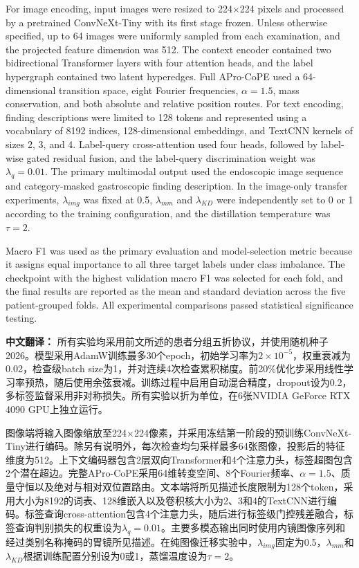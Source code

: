 \documentclass[Afour,sagev,times]{sagej}
\begin{document}
For image encoding, input images were resized to 224$\times$224 pixels and processed by a pretrained ConvNeXt-Tiny with its first stage frozen. Unless otherwise specified, up to 64 images were uniformly sampled from each examination, and the projected feature dimension was 512. The context encoder contained two bidirectional Transformer layers with four attention heads, and the label hypergraph contained two latent hyperedges. Full APro-CoPE used a 64-dimensional transition space, eight Fourier frequencies, $\alpha=1.5$, mass conservation, and both absolute and relative position routes. For text encoding, finding descriptions were limited to 128 tokens and represented using a vocabulary of 8192 indices, 128-dimensional embeddings, and TextCNN kernels of sizes 2, 3, and 4. Label-query cross-attention used four heads, followed by label-wise gated residual fusion, and the label-query discrimination weight was $\lambda_q=0.01$. The primary multimodal output used the endoscopic image sequence and category-masked gastroscopic finding description. In the image-only transfer experiments, $\lambda_{img}$ was fixed at 0.5, $\lambda_{mm}$ and $\lambda_{KD}$ were independently set to 0 or 1 according to the training configuration, and the distillation temperature was $\tau=2$.

Macro F1 was used as the primary evaluation and model-selection metric because it assigns equal importance to all three target labels under class imbalance. The checkpoint with the highest validation macro F1 was selected for each fold, and the final results are reported as the mean and standard deviation across the five patient-grouped folds. All experimental comparisons passed statistical significance testing.

\textbf{中文翻译：} 所有实验均采用前文所述的患者分组五折协议，并使用随机种子2026。模型采用AdamW训练最多30个epoch，初始学习率为$2\times10^{-5}$，权重衰减为0.02，检查级batch size为1，并对连续4次检查累积梯度。前20\%优化步采用线性学习率预热，随后使用余弦衰减。训练过程中启用自动混合精度，dropout设为0.2，多标签监督采用非对称损失。所有实验以折为单位，在6张NVIDIA GeForce RTX 4090 GPU上独立运行。

图像端将输入图像缩放至224$\times$224像素，并采用冻结第一阶段的预训练ConvNeXt-Tiny进行编码。除另有说明外，每次检查均匀采样最多64张图像，投影后的特征维度为512。上下文编码器包含2层双向Transformer和4个注意力头，标签超图包含2个潜在超边。完整APro-CoPE采用64维转变空间、8个Fourier频率、$\alpha=1.5$、质量守恒以及绝对与相对双位置路由。文本端将所见描述长度限制为128个token，采用大小为8192的词表、128维嵌入以及卷积核大小为2、3和4的TextCNN进行编码。标签查询cross-attention包含4个注意力头，随后进行标签级门控残差融合，标签查询判别损失的权重设为$\lambda_q=0.01$。主要多模态输出同时使用内镜图像序列和经过类别名称掩码的胃镜所见描述。在纯图像迁移实验中，$\lambda_{img}$固定为0.5，$\lambda_{mm}$和$\lambda_{KD}$根据训练配置分别设为0或1，蒸馏温度设为$\tau=2$。
\end{document}
